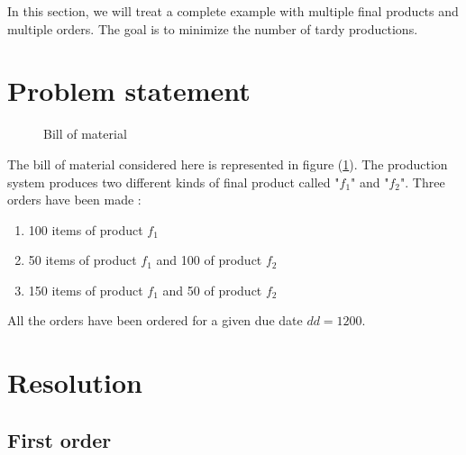 In this section, we will treat a complete example with multiple final products and multiple orders. The goal is to minimize the number of tardy productions. 

\section{Problem statement}

\begin{figure}[h!]
    \centering
    \caption{\label{worked_example:bom}Bill of material}
\end{figure}

The bill of material considered here is represented in figure (\ref{worked_example:bom}). The production system produces two different kinds of final product called "$f_1$" and "$f_2$". Three orders have been made :
\begin{enumerate}
    \item 100 items of product $f_1$
    \item 50 items of product $f_1$ and 100 of product $f_2$
    \item 150 items of product $f_1$ and 50 of product $f_2$
\end{enumerate}

All the orders have been ordered for a given due date $dd = 1200$.

\section{Resolution}

\subsection{First order}

